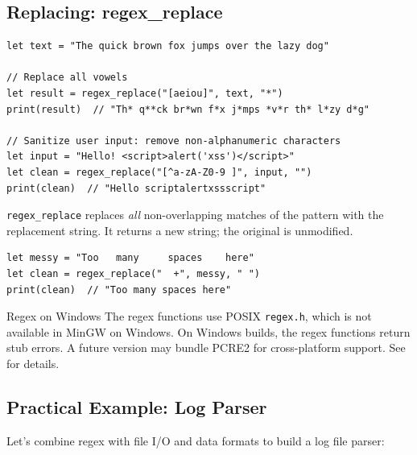 \subsection{Replacing: regex\_replace}\label{sec:regex-replace}

\begin{lstlisting}[language=Lattice, caption={Replacing patterns in text}]
let text = "The quick brown fox jumps over the lazy dog"

// Replace all vowels
let result = regex_replace("[aeiou]", text, "*")
print(result)  // "Th* q**ck br*wn f*x j*mps *v*r th* l*zy d*g"

// Sanitize user input: remove non-alphanumeric characters
let input = "Hello! <script>alert('xss')</script>"
let clean = regex_replace("[^a-zA-Z0-9 ]", input, "")
print(clean)  // "Hello scriptalertxssscript"
\end{lstlisting}

\lstinline|regex_replace| replaces \emph{all} non-overlapping matches of the
pattern with the replacement string. It returns a new string; the original
is unmodified.

\begin{lstlisting}[language=Lattice, caption={Normalizing whitespace}]
let messy = "Too   many     spaces    here"
let clean = regex_replace("  +", messy, " ")
print(clean)  // "Too many spaces here"
\end{lstlisting}

\begin{notebox}{Regex on Windows}
The regex functions use POSIX \texttt{regex.h}, which is not available in
MinGW on Windows. On Windows builds, the regex functions return stub errors.
A future version may bundle PCRE2 for cross-platform support. See
 for details.
\end{notebox}

\subsection{Practical Example: Log Parser}\label{sec:regex-example}

Let's combine regex with file I/O and data formats to build a log file
parser:

